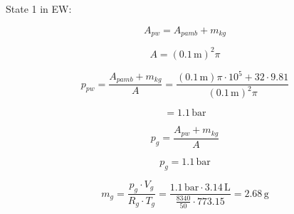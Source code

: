 State 1 in EW:  

\[ A_{pw} = A_{pamb} + m_{kg} \]  

\[ A = (0.1 \, \text{m})^2 \pi \]  

\[ p_{pw} = \frac{A_{pamb} + m_{kg}}{A} = \frac{(0.1 \, \text{m}) \pi \cdot 10^5 + 32 \cdot 9.81}{(0.1 \, \text{m})^2 \pi} \]  

\[ = 1.1 \, \text{bar} \]  

\[ p_{g} = \frac{A_{pw} + m_{kg}}{A} \]  

\[ p_{g} = 1.1 \, \text{bar} \]  

\[ m_{g} = \frac{p_{g} \cdot V_{g}}{R_{g} \cdot T_{g}} = \frac{1.1 \, \text{bar} \cdot 3.14 \, \text{L}}{\frac{8340}{50} \cdot 773.15} = 2.68 \, \text{g} \]